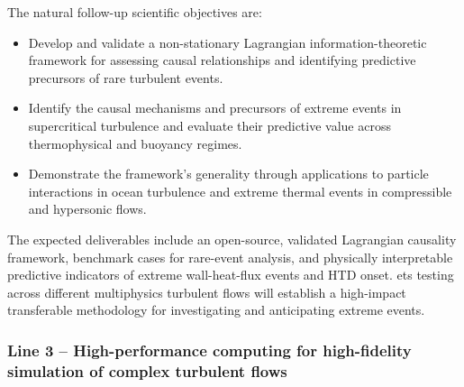 \documentclass[11pt]{article}
\begin{document}
The natural follow-up scientific objectives are:
\begin{itemize}
	\item[\textbf{O4.}] Develop and validate a non-stationary Lagrangian information-theoretic framework for assessing causal relationships and identifying predictive precursors of rare turbulent events.
	\item[\textbf{O5.}] Identify the causal mechanisms and precursors of extreme events in supercritical turbulence and evaluate their predictive value across thermophysical and buoyancy regimes.
	\item[\textbf{O6.}] Demonstrate the framework's generality through applications to particle interactions in ocean turbulence and extreme thermal events in compressible and hypersonic flows.
\end{itemize}
The expected deliverables include an open-source, validated Lagrangian causality framework, benchmark cases for rare-event analysis, and physically interpretable predictive indicators of extreme wall-heat-flux events and HTD onset.
ets testing across different multiphysics turbulent flows will establish a high-impact transferable methodology for investigating and anticipating extreme events.

\subsubsection{Line 3 -- High-performance computing for high-fidelity simulation of complex turbulent flows}
\end{document}
